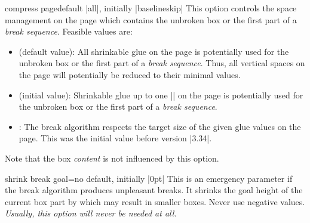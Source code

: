 \begin{docTcbKey}[][doc new=2014-12-15]{compress page}{}{default |all|, initially |baselineskip|}
  This option controls the space management on the page which contains the
  unbroken box or the first part of a \emph{break sequence}.
  Feasible  values are:
  \begin{itemize}
  \item{} (default value):
    All shrinkable glue on the page is potentially used for the
    unbroken box or the first part of a \emph{break sequence}. Thus, all
    vertical spaces on the page will potentially be reduced to their
    minimal values.
  \item{} (initial value):
    Shrinkable glue up to one |\baselineskip| on the page is potentially used for the
    unbroken box or the first part of a \emph{break sequence}.
  \item{}:
    The break algorithm respects the target size of the given glue values
    on the page. This was the initial value before version |3.34|.
  \end{itemize}
  \begin{marker}
  Note that the box \emph{content} is not influenced by this option.
  \end{marker}
\end{docTcbKey}


\begin{docTcbKey}{shrink break goal}{=}{no default, initially |0pt|}
  This is an emergency parameter if the break algorithm produces unpleasant
  breaks.
  It shrinks the goal height of the current box part by 
  which may result in smaller boxes. Never use negative values.
  \emph{Usually, this option will never be needed at all.}
\end{docTcbKey}



